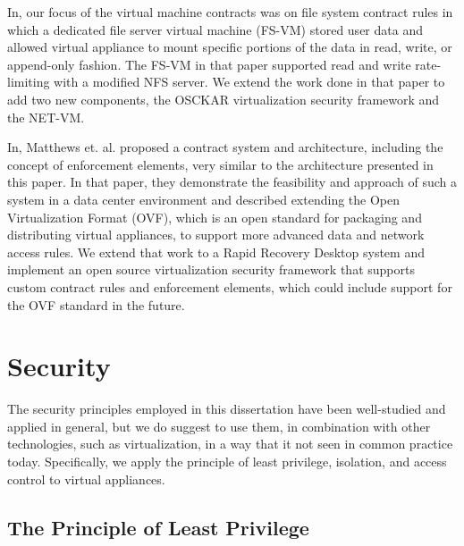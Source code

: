 In\cite{rapid_recovery_paper_05}, our focus of the virtual machine contracts was on file system contract rules in which a dedicated file server virtual machine (FS-VM) stored user data and allowed virtual appliance to mount specific portions of the data in read, write, or append-only fashion. The FS-VM in that paper supported read and write rate-limiting with a modified NFS server. We extend the work done in that paper to add two new components, the OSCKAR virtualization security framework and the NET-VM.

In\cite{virtual_machine_contract_ICAC09}, Matthews et. al. proposed a contract system and architecture, including the concept of enforcement elements, very similar to the architecture presented in this paper. In that paper, they demonstrate the feasibility and approach of such a system in a data center environment and described extending the Open Virtualization Format (OVF)\cite{dmtf_newsletter}, which is an open standard for packaging and distributing virtual appliances, to support more advanced data and network access rules. We extend that work to a Rapid Recovery Desktop system and implement an open source virtualization security framework that supports custom contract rules and enforcement elements, which could include support for the OVF standard in the future.

\section{Security}

The security principles employed in this dissertation have been well-studied and applied in general, but we do suggest to use them, in combination with other technologies, such as virtualization, in a way that it not seen in common practice today. Specifically, we apply the principle of least privilege, isolation, and access control to virtual appliances.

\subsection{The Principle of Least Privilege}

